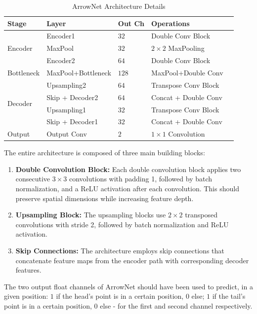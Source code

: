 \documentclass[conference]{IEEEtran}
\begin{document}
\begin{appendices}
\begin{table}[htbp]
	\centering
	\caption{ArrowNet Architecture Details}
	\label{tab:arrownet}
	\begin{tabular}{|l|l|l|l|l|}
		\hline
		\textbf{Stage} & \textbf{Layer} & \textbf{Out Ch} & \textbf{Operations} \\
		\hline
		\multirow{3}{*}{Encoder} 
		& Encoder1 & $32$ & Double Conv Block \\
		& MaxPool & $32$ & $2 \times 2$ MaxPooling \\
		& Encoder2 & $64$ & Double Conv Block \\
		\hline
		Bottleneck 
		& MaxPool+Bottleneck & $128$ & MaxPool+Double Conv \\
		\hline
		\multirow{4}{*}{Decoder}
		& Upsampling2 & $64$ & Transpose Conv Block \\
		& Skip + Decoder2 & $64$ & Concat + Double Conv \\
		& Upsampling1 & $32$ & Transpose Conv Block \\
		& Skip + Decoder1 & $32$ & Concat + Double Conv \\
		\hline
		Output & Output Conv & $2$ & $1 \times 1$ Convolution \\
		\hline
	\end{tabular}
	\label{table:arrownet}
\end{table}

The entire architecture is composed of three main building blocks:

\begin{enumerate}
\item \textbf{Double Convolution Block:} Each double convolution block applies two consecutive $3 \times 3$ convolutions with padding 1, followed by batch normalization, and a ReLU activation after each convolution. This should preserve spatial dimensions while increasing feature depth.

\item \textbf{Upsampling Block:} The upsampling blocks use $2 \times 2$ transposed convolutions with stride 2, followed by batch normalization and ReLU activation.

\item \textbf{Skip Connections:} The architecture employs skip connections that concatenate feature maps from the encoder path with corresponding decoder features.

\end{enumerate}

The two output float channels of ArrowNet should have been used to predict, in a given position: $1$ if the head's point is in a certain position, $0$ else; $1$ if the tail's point is in a certain position, $0$ else - for the first and second channel respectively.


\end{appendices}
\end{document}
